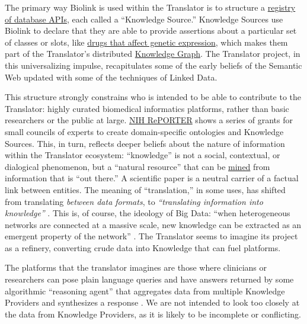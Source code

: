 The primary way Biolink is used within the Translator is to structure a
\href{http://www.smart-api.info/registry}{registry of database APIs},
each called a ``Knowledge Source.'' Knowledge Sources use Biolink to
declare that they are able to provide assertions about a particular set
of classes or slots, like
\href{http://www.smart-api.info/ui/adf20dd6ff23dfe18e8e012bde686e31}{drugs
that affect genetic expression}, which makes them part of the
Translator's distributed
\href{http://www.smart-api.info/portal/translator/metakg}{Knowledge
Graph}. The Translator project, in this universalizing impulse,
recapitulates some of the early beliefs of the Semantic Web updated with
some of the techniques of Linked Data.

This structure strongly constrains who is intended to be able to
contribute to the Translator: highly curated biomedical informatics
platforms, rather than basic researchers or the public at large.
\href{https://reporter.nih.gov/search/DShVUhB_ZUq0X5UWFjy5WQ/projects?shared=true}{NIH
RePORTER} shows a series of grants for small councils of experts to
create domain-specific ontologies and Knowledge Sources. This, in turn,
reflects deeper beliefs about the nature of information within the
Translator ecosystem: ``knowledge'' is not a social, contextual, or
dialogical phenomenon, but a ``natural resource'' that can be
\href{https://reporter.nih.gov/project-details/10548337}{mined} from
information that is ``out there.'' A scientific paper is a neutral
carrier of a factual link between entities. The meaning of
``translation,'' in some uses, has shifted from translating
\emph{between data formats}, to \emph{``translating information into
knowledge''} \cite{consortiumUniversalBiomedicalData2019} . This
is, of course, the ideology of Big Data: ``when heterogeneous networks
are connected at a massive scale, new knowledge can be extracted as an
emergent property of the network'' \cite{morrisScalablePrecisionMedicine2023} . The Translator seems to
imagine its project as a refinery, converting crude data into Knowledge
that can fuel platforms.

The platforms that the translator imagines are those where clinicians or
researchers can pose plain language queries and have answers returned by
some algorithmic ``reasoning agent'' that aggregates data from multiple
Knowledge Providers and synthesizes a response \cite{unniBiolinkModelUniversal2022, renaissancecomputinginstituterenciBiomedicalDataTranslator2022, renaissancecomputinginstituterenciUseCasesShow2022, goelExplanationContainerCaseBased2021, hailuNIHfundedProjectAims2019} . We are not intended to look too closely at the data from Knowledge
Providers, as it is likely to be incomplete or conflicting.

